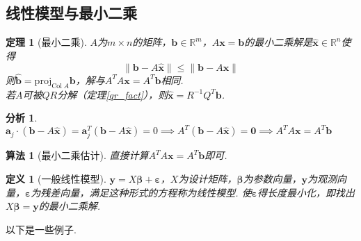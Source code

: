 \documentclass[11pt,UTF8]{ctexart}
\newtheorem{theorem}{定理}
\newtheorem{algorithm}{算法}
\newtheorem{definition}{定义}
\newtheorem*{analysis}{分析}
\def\vx{\mathbf{x}}
\def\vy{\mathbf{y}}
\def\vbb{\bm{\beta}}
\def\dis{\displaystyle}
\newcommand{\vb}[1]{\mathbf{#1}}
\begin{document}
\subsection{线性模型与最小二乘}%
\begin{theorem}[最小二乘]
$A$为$m\times n$的矩阵，$\mathbf{b}\in\mathbb{R}^m$，$A\mathbf{x}=\mathbf{b}$的最小二乘解是$\hat{\mathbf{x}}\in\mathbb{R}^n$使得
\[\|\vb{b}-A\hat{\vx}\|\leq\|\vb{b}-A\vx\|\]
则$\dis\hat{\vb{b}}=\mathrm{proj}_{\mathrm{Col}\;A}\vb{b}$，解与$A^TA\vx=A^T\vb{b}$相同.\\
若$A$可被$QR$分解（定理\ref{qr_fact}），则$\hat{\vx}=R^{-1}Q^T\vb{b}$.
\end{theorem}
\begin{analysis}
$\vb{a}_j\cdot(\vb{b}-A\hat{\vx})=\vb{a}_j^T(\vb{b}-A\hat{\vx})=0\implies A^T(\vb{b}-A\hat{\vx})=\vb{0}\implies A^TA\vx=A^T\vb{b}$
\end{analysis}
\begin{algorithm}[最小二乘估计]
直接计算$A^TA\vx=A^T\vb{b}$即可.
\end{algorithm}
\begin{definition}[一般线性模型]
$\vb{y}=X\bm{\beta}+\bm{\varepsilon}$，$X$为设计矩阵，$\vbb$为参数向量，$\vy$为观测向量，$\bm{\varepsilon}$为残差向量，满足这种形式的方程称为线性模型. 使$\bm{\varepsilon}$得长度最小化，即找出$X\vbb=\vy$的最小二乘解.
\end{definition}
以下是一些例子.
\end{document}
